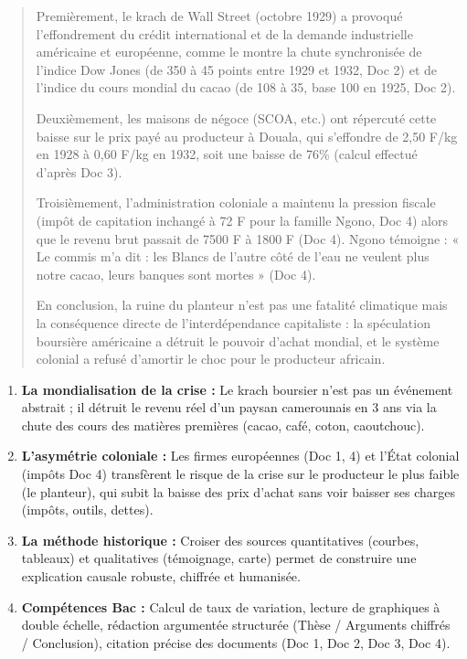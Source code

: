\documentclass[11pt]{article}
\newcounter{popsec}
\newcounter{popsub}
\newcommand{\courssub}[1]{%
  \stepcounter{popsub}%
  \par\vspace{9pt}\noindent{\popxbold\fontsize{11.5}{13}\selectfont\color{popink}{\color{poporange}\thepopsec.\thepopsub}\hspace{6pt}#1}\par\nopagebreak\vspace{4pt}
}
\begin{document}
\begin{exoresolu}
\begin{quote}
Premièrement, le krach de Wall Street (octobre 1929) a provoqué l'effondrement du crédit international et de la demande industrielle américaine et européenne, comme le montre la chute synchronisée de l'indice Dow Jones (de 350 à 45 points entre 1929 et 1932, Doc 2) et de l'indice du cours mondial du cacao (de 108 à 35, base 100 en 1925, Doc 2). 

Deuxièmement, les maisons de négoce (SCOA, etc.) ont répercuté cette baisse sur le prix payé au producteur à Douala, qui s'effondre de 2,50 F/kg en 1928 à 0,60 F/kg en 1932, soit une baisse de 76\% (calcul effectué d'après Doc 3). 

Troisièmement, l'administration coloniale a maintenu la pression fiscale (impôt de capitation inchangé à 72 F pour la famille Ngono, Doc 4) alors que le revenu brut passait de 7500 F à 1800 F (Doc 4). Ngono témoigne : « Le commis m'a dit : les Blancs de l'autre côté de l'eau ne veulent plus notre cacao, leurs banques sont mortes » (Doc 4). 

En conclusion, la ruine du planteur n'est pas une fatalité climatique mais la conséquence directe de l'interdépendance capitaliste : la spéculation boursière américaine a détruit le pouvoir d'achat mondial, et le système colonial a refusé d'amortir le choc pour le producteur africain.
\end{quote}
\end{exoresolu}

\courssub{Bilan de l'activité}
\begin{aretenir}
\begin{enumerate}
    \item \textbf{La mondialisation de la crise :} Le krach boursier n'est pas un événement abstrait ; il détruit le revenu réel d'un paysan camerounais en 3 ans via la chute des cours des matières premières (cacao, café, coton, caoutchouc).
    \item \textbf{L'asymétrie coloniale :} Les firmes européennes (Doc 1, 4) et l'État colonial (impôts Doc 4) transfèrent le risque de la crise sur le producteur le plus faible (le planteur), qui subit la baisse des prix d'achat sans voir baisser ses charges (impôts, outils, dettes).
    \item \textbf{La méthode historique :} Croiser des sources quantitatives (courbes, tableaux) et qualitatives (témoignage, carte) permet de construire une explication causale robuste, chiffrée et humanisée.
    \item \textbf{Compétences Bac :} Calcul de taux de variation, lecture de graphiques à double échelle, rédaction argumentée structurée (Thèse / Arguments chiffrés / Conclusion), citation précise des documents (Doc 1, Doc 2, Doc 3, Doc 4).
\end{enumerate}
\end{aretenir}
\end{document}
